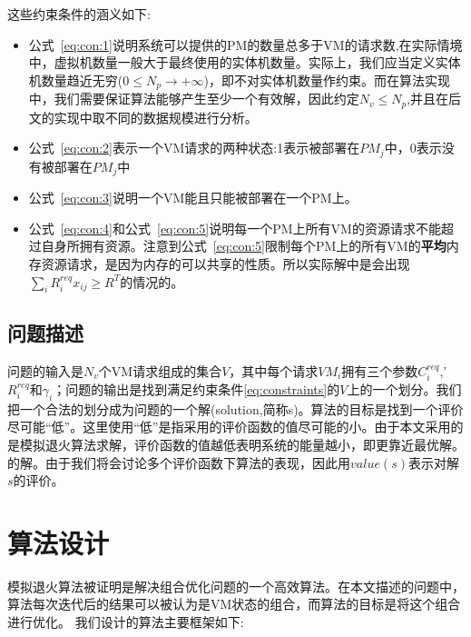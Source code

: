 这些约束条件的涵义如下:

\begin{itemize}
\item 公式~\eqref{eq:con:1}说明系统可以提供的PM的数量总多于VM的请求数,在实际情境中，虚拟机数量一般大于最终使用的实体机数量。实际上，我们应当定义实体机数量趋近无穷($0 \leq N_p \rightarrow +\infty$)，即不对实体机数量作约束。而在算法实现中，我们需要保证算法能够产生至少一个有效解，因此约定$N_v \leq N_p$,并且在后文的实现中取不同的数据规模进行分析。
\item 公式~\eqref{eq:con:2}表示一个VM请求的两种状态:1表示被部署在$PM_j$中，0表示没有被部署在$PM_j$中

\item 公式~\eqref{eq:con:3}说明一个VM能且只能被部署在一个PM上。

\item 公式~\eqref{eq:con:4}和公式~\eqref{eq:con:5}说明每一个PM上所有VM的资源请求不能超过自身所拥有资源。注意到公式~\eqref{eq:con:5}限制每个PM上的所有VM的\textbf{平均}内存资源请求，是因为内存的可以共享的性质。所以实际解中是会出现$\sum_i R^{req}_i x_{ij} \geq R^T$的情况的。
\end{itemize}

\subsection*{问题描述}
\label{problem-description}
问题的输入是$N_v$个VM请求组成的集合$V$，其中每个请求$VM_i$拥有三个参数$C^{req}_i$,'$R^{req}_i$和$\gamma_i$；问题的输出是找到满足约束条件\eqref{eq:constraints}的$V$上的一个划分。我们把一个合法的划分成为问题的一个解(solution,简称s)。算法的目标是找到一个评价尽可能``低''。这里使用``低''是指采用的评价函数的值尽可能的小。由于本文采用的是模拟退火算法求解，评价函数的值越低表明系统的能量越小，即更靠近最优解。的解。由于我们将会讨论多个评价函数下算法的表现，因此用$value(s)$表示对解$s$的评价。



\section{算法设计}
\label{sec:design}
模拟退火算法被证明是解决组合优化问题的一个高效算法。在本文描述的问题中，算法每次迭代后的结果可以被认为是VM状态的组合，而算法的目标是将这个组合进行优化。
我们设计的算法主要框架如下:

